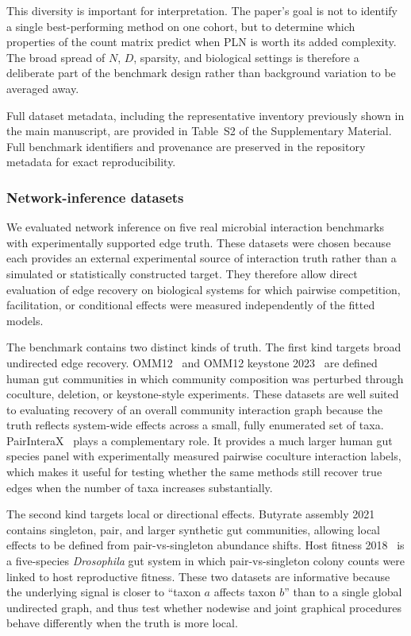 \documentclass[Review,doublespace,sageh,times]{sagej}
\begin{document}
This diversity is important for interpretation.
The paper's goal is not to identify a single best-performing method on one cohort, but to determine which properties of the count matrix predict when PLN is worth its added complexity.
The broad spread of $N$, $D$, sparsity, and biological settings is therefore a deliberate part of the benchmark design rather than background variation to be averaged away.

Full dataset metadata, including the representative inventory previously shown in the main manuscript, are provided in Table~S2 of the Supplementary Material.
Full benchmark identifiers and provenance are preserved in the repository metadata for exact reproducibility.


\subsubsection{Network-inference datasets}
\label{subsubsec:network-inference-datasets}
We evaluated network inference on five real microbial interaction benchmarks with experimentally supported edge truth.
These datasets were chosen because each provides an external experimental source of interaction truth rather than a simulated or statistically constructed target.
They therefore allow direct evaluation of edge recovery on biological systems for which pairwise competition, facilitation, or conditional effects were measured independently of the fitted models.

The benchmark contains two distinct kinds of truth.
The first kind targets broad undirected edge recovery.
OMM12~\citep{Weiss2022OMM12} and OMM12 keystone 2023~\citep{Weiss2023Keystone} are defined human gut communities in which community composition was perturbed through coculture, deletion, or keystone-style experiments.
These datasets are well suited to evaluating recovery of an overall community interaction graph because the truth reflects system-wide effects across a small, fully enumerated set of taxa.
PairInteraX~\citep{Zhu2025PairInteraX} plays a complementary role.
It provides a much larger human gut species panel with experimentally measured pairwise coculture interaction labels, which makes it useful for testing whether the same methods still recover true edges when the number of taxa increases substantially.

The second kind targets local or directional effects.
Butyrate assembly 2021~\citep{Clark2021Butyrate} contains singleton, pair, and larger synthetic gut communities, allowing local effects to be defined from pair-vs-singleton abundance shifts.
Host fitness 2018~\citep{Gould2018HostFitness} is a five-species \textit{Drosophila} gut system in which pair-vs-singleton colony counts were linked to host reproductive fitness.
These two datasets are informative because the underlying signal is closer to ``taxon $a$ affects taxon $b$'' than to a single global undirected graph, and thus test whether nodewise and joint graphical procedures behave differently when the truth is more local.
\end{document}
